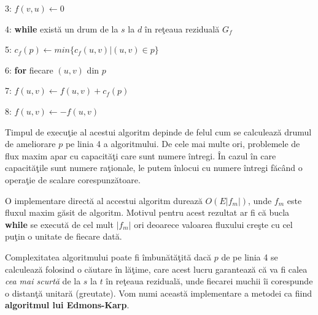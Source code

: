 \documentclass[11pt,a4paper]{report}
\begin{document}
   	3: \hspace{0.6cm} $f(v,u)\leftarrow 0$
   	
   	4: \textbf{while} exist\u a un drum de la $s$ la $d$  \^ in re\c teaua rezidual\u a $G_f$ 
   	
   	5: \hspace{0.6cm} $c_f(p)\leftarrow min\{c_f(u,v)|(u,v)\in p\}$
   	
   	6: \hspace{0.6cm} \textbf{for} fiecare $(u,v)$ din $p$ 
   	
   	7:\hspace{1.2cm} $f(u,v)\leftarrow f(u,v)+c_f(p)$
   	
   	8:\hspace{1.2cm} $f(u,v)\leftarrow -f(u,v)$
   	\vspace{0.3cm}
   	
   	
   	Timpul de execu\c tie al acestui algoritm depinde de felul cum se calculeaz\u a drumul de ameliorare $p$ pe linia 4 a algoritmului. De cele mai multe ori, problemele de flux maxim apar cu capacit\u a\c ti care sunt numere \^ intregi.  \^ In cazul \^ in care capacit\u a\c tile sunt numere ra\c tionale, le putem \^ inlocui cu numere \^ intregi f\u ac\^ and o opera\c tie de scalare corespunz\u atoare.
   	
   	O implementare direct\u a al accestui algoritm dureaz\u a $O(E|f_m|)$, unde $f_m$ este fluxul maxim g\u asit de algoritm. Motivul pentru acest rezultat ar fi c\u a bucla \textbf{while} se execut\u a de cel mult $|f_m|$ ori deoarece valoarea fluxului cre\c ste cu cel pu\c tin o unitate de fiecare dat\u a. 
   	
   	Complexitatea algoritmului poate fi \^ imbun\u at\u a\c tit\u a dac\u a $p$ de pe linia 4 se calculeaz\u a folosind o c\u autare \^ in l\u a\c time, care acest lucru garanteaz\u a c\u a va fi calea \textit{cea mai scurt\u a} de la $s$ la $t$ \^ in re\c teaua rezidual\u a, unde  fiecarei muchii \^ ii corespunde o distan\c t\u a unitar\u a (greutate). Vom numi aceast\u a implementare a metodei ca fiind \textbf{algoritmul lui Edmons-Karp}.
   	
   	
   	
\end{document}
